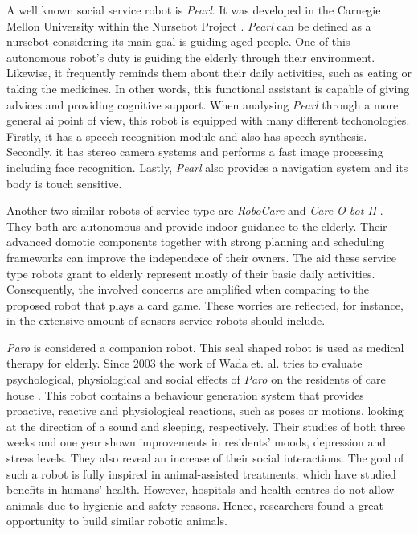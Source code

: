 A well known social service robot is \emph{Pearl}.
It was developed in the Carnegie Mellon University within the Nursebot Project \cite{Pollack2002}.
\emph{Pearl} can be defined as a nursebot considering its main goal is guiding aged people.
One of this autonomous robot's duty is guiding the elderly through their environment.
Likewise, it frequently reminds them about their daily activities, such as eating or taking the medicines.
In other words, this functional assistant is capable of giving advices and providing cognitive support.
When analysing \emph{Pearl} through a more general \gls{ai} point of view, this robot is equipped with many different techonologies.
Firstly, it has a speech recognition module and also has speech synthesis.
Secondly, it has stereo camera systems and performs a fast image processing including face recognition.
Lastly, \emph{Pearl} also provides a navigation system and its body is touch sensitive.

Another two similar robots of service type are \emph{RoboCare} \cite{Bahadori} and \emph{Care-O-bot II} \cite{Graf2004}.
They both are autonomous and provide indoor guidance to the elderly.
Their advanced domotic components together with strong planning and scheduling frameworks can improve the independece of their owners.
The aid these service type robots grant to elderly represent mostly of their basic daily activities.
Consequently, the involved concerns are amplified when comparing to the proposed robot that plays a card game.
These worries are reflected, for instance, in the extensive amount of sensors service robots should include.

\emph{Paro} is considered a companion robot.
This seal shaped robot is used as medical therapy for elderly.
Since 2003 the work of Wada et. al. tries to evaluate psychological, physiological and social effects of \emph{Paro} on the residents of care house \cite{Wada2003}\cite{Wada2005}\cite{Wada2007}.
This robot contains a behaviour generation system that provides proactive, reactive and physiological reactions, such as poses or motions, looking at the direction of a sound and sleeping, respectively.
Their studies of both three weeks and one year shown improvements in residents' moods, depression and stress levels.
They also reveal an increase of their social interactions.
The goal of such a robot is fully inspired in animal-assisted treatments, which have studied benefits in humans' health.
However, hospitals and health centres do not allow animals due to hygienic and safety reasons.
Hence, researchers found a great opportunity to build similar robotic animals.

